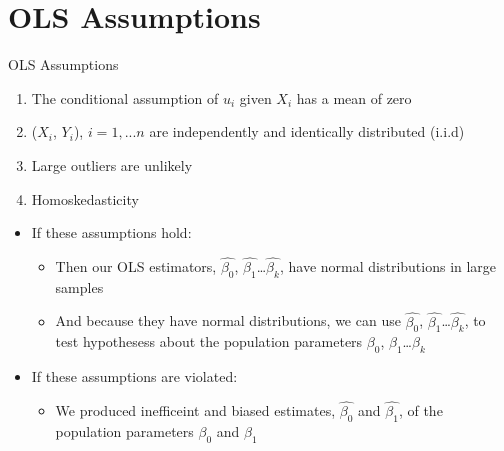 \documentclass[
  8pt,
  ignorenonframetext,
  dvipsnames]{beamer}
\providecommand{\tightlist}{%
  \setlength{\itemsep}{0pt}\setlength{\parskip}{0pt}}
\let\olditem\item
\renewcommand{\item}{%
  \olditem\vspace{4pt}
}
\begin{document}
\hypertarget{ols-assumptions}{%
\section{OLS Assumptions}\label{ols-assumptions}}

\begin{frame}{OLS Assumptions}
\protect\hypertarget{ols-assumptions-1}{}

\begin{enumerate}
\tightlist
\item
  The conditional assumption of \(u_i\) given \(X_i\) has a mean of zero
\item
  (\(X_i\), \(Y_i\)), \(i=1, ...n\) are independently and identically
  distributed (i.i.d)
\item
  Large outliers are unlikely
\item
  Homoskedasticity
\end{enumerate}

\medskip

\begin{itemize}
\tightlist
\item
  If these assumptions hold:

  \begin{itemize}
  \tightlist
  \item
    Then our OLS estimators, \(\hat{\beta_0}\),
    \(\hat{\beta_1}\)\ldots{}\(\hat{\beta_k}\), have normal
    distributions in large samples
  \item
    And because they have normal distributions, we can use
    \(\hat{\beta_0}\), \(\hat{\beta_1}\)\ldots{}\(\hat{\beta_k}\), to
    test hypothesess about the population parameters \(\beta_0\),
    \(\beta_1\)\ldots{}\(\beta_k\)
  \end{itemize}
\item
  If these assumptions are violated:

  \begin{itemize}
  \tightlist
  \item
    We produced inefficeint and biased estimates, \(\hat{\beta_0}\) and
    \(\hat{\beta_1}\), of the population parameters \(\beta_0\) and
    \(\beta_1\)
  \end{itemize}
\end{itemize}

\end{frame}
\end{document}
